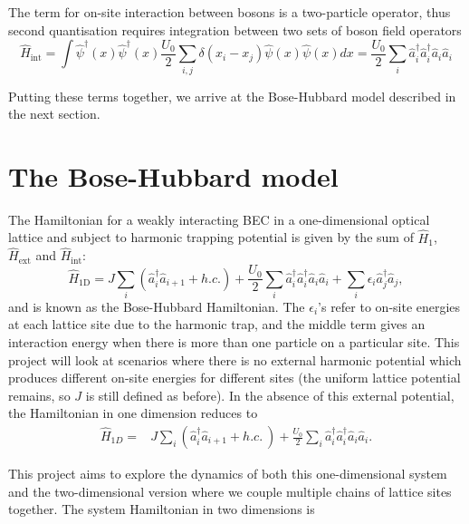 \documentclass[a4paper, 10pt]{article}
\theoremstyle{plain}
\begin{document}
The term for on-site interaction between bosons is a two-particle operator, thus
second quantisation requires integration between two sets of boson field
operators
\begin{equation}
    \hat{H}_{\text{int}} =
    \int{\hat{\psi}^{\dagger}(x) \hat{\psi}^{\dagger}(x)
          \frac{U_{0}}{2} \sum_{i,j}{\delta(x_{i}-x_{j})}
          \hat{\psi}(x) \hat{\psi}(x) dx
        }
    =
    \frac{U_{0}}{2}
    \sum_{i}
        {\hat{a}_{i}^{\dagger} \hat{a}_{i}^{\dagger} \hat{a}_{i} \hat{a}_{i}}
\end{equation}

Putting these terms together, we arrive at the Bose-Hubbard model described in
the next section.


\section{The Bose-Hubbard model}

The Hamiltonian for a weakly interacting BEC in a one-dimensional optical
lattice and subject to harmonic trapping potential is given by the sum of
$\hat{H}_{1}$, $\hat{H}_{\text{ext}}$ and $\hat{H}_{\text{int}}$:
\begin{equation}
    \hat{H}_{\text{1D}}
    =
    J \sum_{i}{(\hat{a}^\dagger_{i}\hat{a}_{i+1} + h.c.)} +
    \frac{U_{0}}{2}
    \sum_{i}%
        {\hat{a}_{i}^{\dagger} \hat{a}_{i}^{\dagger} \hat{a}_{i} \hat{a}_{i}} +
    \sum_{i}%
        {\epsilon_{i} \hat{a}_{j}^{\dagger} \hat{a}_{j}},
\end{equation}
and is known as the Bose-Hubbard Hamiltonian. The $\epsilon_{i}$'s refer to
on-site energies at each lattice site due to the harmonic trap, and the middle
term gives an interaction energy when there is more than one particle on a
particular site. This project will look at scenarios where there is no external
harmonic potential which produces different on-site energies for different sites
(the uniform lattice potential remains, so $J$ is still defined as before). In
the absence of this external potential, the Hamiltonian in one dimension reduces
to
\begin{equation}
\begin{align*}
\hat{H}_{1D}
=
&J\sum_{i}(\hat{a}^\dagger_{i}\hat{a}_{i+1}+h.c.\ )
+
\frac{U_0}{2}\sum_{i}\hat{a}^\dagger_{i}\hat{a}^\dagger_{i}
\hat{a}_{i}\hat{a}_{i}.
\end{align*}
\end{equation}

This project aims to explore the dynamics of both this one-dimensional system
and the two-dimensional version where we couple multiple chains of lattice
sites together. The system Hamiltonian in two dimensions is
\end{document}
